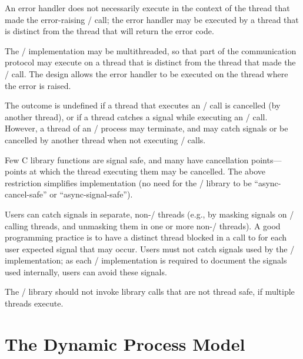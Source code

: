 An error handler does not necessarily execute in the context of the
thread that made
the error-raising \MPI/ call;  the error handler may be
executed by a thread that is distinct from the thread that will
return the error code.

\begin{rationale}
The \MPI/ implementation may be multithreaded, so that part of the
communication protocol may execute on a thread that is distinct from
the thread that made the \MPI/ call.
The design allows the error handler to be executed on the
thread
where the error is raised.
\end{rationale}

The outcome is undefined if a thread that executes an \MPI/ call is
cancelled (by another thread), or if a thread catches a signal while
executing an \MPI/ call.
However, a thread of an \MPI/ process may terminate, and may catch
signals or be cancelled by another thread when not executing \MPI/ calls.

\begin{rationale}
Few C library functions are signal safe, and many have cancellation
points---points at which the thread executing them may be cancelled.  The
above restriction simplifies implementation (no need for the \MPI/
library to be ``async-cancel-safe'' or ``async-signal-safe'').
\end{rationale}

\begin{users}
Users can catch signals in separate, non-\MPI/ threads (e.g., by
masking signals on \MPI/ calling threads, and unmasking them in one or
more non-\MPI/ threads).
A good programming practice is to have a distinct thread blocked
in a call to  for each user expected signal that may occur.
Users must not catch signals used by the \MPI/ implementation; as
each \MPI/ implementation is required to document the signals used
internally, users can avoid these signals.
\end{users}

\begin{implementors}
The \MPI/ library should not invoke  library calls that are
not thread safe, if multiple threads execute.
\end{implementors}


\section{The Dynamic Process Model}
\label{sec:model}

